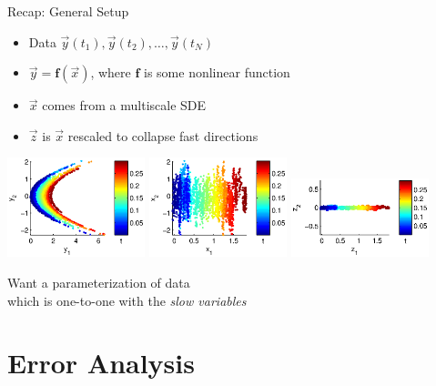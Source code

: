 \documentclass[12pt]{beamer}
\begin{document}
\begin{frame}{Recap: General Setup}


\begin{itemize}

\item Data $\vec{y}(t_1), \vec{y}(t_2), \dots, \vec{y}(t_N)$


\item $\vec{y} = \mathbf{f}(\vec{x})$, where $\mathbf{f}$ is some nonlinear function


\item $\vec{x}$ comes from a multiscale SDE


\item $\vec{z}$ is $\vec{x}$ rescaled to collapse fast directions



\end{itemize}

\centering
\includegraphics[width=0.3\textwidth]{data_init_nonlinear}
\hfill
\includegraphics[width=0.3\textwidth]{data_init}
\hfill
\includegraphics[width=0.3\textwidth]{data_rescaled}

 Want a parameterization of data \\which is one-to-one with the {\em slow variables}

\end{frame}

\section{Error Analysis}
\end{document}
